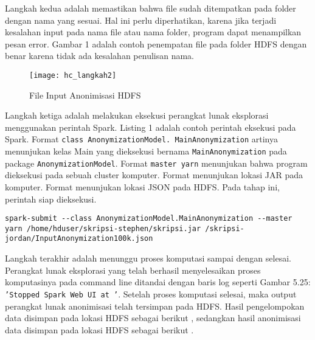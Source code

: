 \vspace{0.3cm}
Langkah kedua adalah memastikan bahwa file sudah ditempatkan pada folder dengan nama yang sesuai. Hal ini perlu diperhatikan, karena jika terjadi kesalahan input pada nama file atau nama folder, program dapat menampilkan pesan error. Gambar 1 adalah contoh penempatan file pada folder HDFS dengan benar karena tidak ada kesalahan penulisan nama.

\begin{figure}[H]
	\centering
	\texttt{[image: hc\_langkah2]}
	\caption{File Input Anonimisasi HDFS}
	\label{fig:pertama2}
\end{figure}

Langkah ketiga adalah melakukan eksekusi perangkat lunak eksplorasi menggunakan perintah Spark. Listing 1 adalah contoh perintah eksekusi pada Spark. Format \texttt{\textemdash\textemdash class AnonymizationModel. MainAnonymization} artinya menunjukan kelas Main yang dieksekusi bernama \texttt{MainAnonymization} pada package \texttt{AnonymizationModel}. Format \texttt{\textemdash\textemdash master yarn} menunjukan bahwa program dieksekusi pada sebuah cluster komputer. Format  menunjukan lokasi JAR pada komputer. Format  menunjukan lokasi JSON pada HDFS. Pada tahap ini, perintah siap dieksekusi.

\newpage
\begin{lstlisting}[basicstyle=\ttfamily, frame=single,
	columns=fullflexible, keepspaces=true, breaklines=true, label=lst:pl_csv, caption=Perintah Eksekusi Spark]
spark-submit --class AnonymizationModel.MainAnonymization --master yarn /home/hduser/skripsi-stephen/skripsi.jar /skripsi-jordan/InputAnonymization100k.json

\end{lstlisting}

\vspace{0.3cm}
Langkah terakhir adalah menunggu proses komputasi sampai dengan selesai.  Perangkat lunak eksplorasi yang telah berhasil menyelesaikan proses komputasinya  pada command line ditandai dengan baris log seperti Gambar 5.25: \texttt{'Stopped Spark Web UI at '}. Setelah proses komputasi selesai, maka output perangkat lunak anonimisasi telah tersimpan pada HDFS. Hasil pengelompokan data disimpan pada lokasi HDFS sebagai berikut , sedangkan hasil anonimisasi data disimpan pada lokasi HDFS sebagai berikut  .


